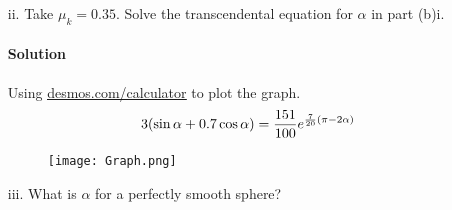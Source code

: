 \documentclass{article}
\begin{document}
{\begin{enumerate}
\begin{enumerate}
				\paragraph{Solution} When the bead leaves the surface of the sphere at $\phi = \alpha$, it is no longer in contact and so the normal force $N = 0$. \unboldmath
				\[
					-mR \dot{\phi}^2 = -mg\sin \alpha
				\]
				\[
					\dot{\phi}^2 = \frac{g}{R} \sin \alpha
				\]
				\begin{equation*}
					\begin{split}
						\frac{g}{R} \sin \alpha &= \frac{2g}{R\left( 4\mu_k^2 + 1 \right)} \left[ \left( 2\mu_k^2 - 1 \right) \left( \sin \alpha - e^{\mu_k \left( \pi - 2\alpha \right)} \right) - 3\mu_k \cos \alpha \right] \\
						\sin \alpha &= \frac{2}{4\mu_k^2 + 1} \left[ \left( 2\mu_k^2 - 1 \right)\sin \alpha - \left( 2\mu_k^2 - 1 \right)e^{\mu_k \left( \pi - 2\alpha \right)} - 3\mu_k \cos \alpha \right] \\
						\left( 4\mu_k^2 + 1 \right) \sin \alpha &= 2\left( 2\mu_k^2 - 1 \right)\sin \alpha - 2\left( 2\mu_k^2 - 1 \right)e^{\mu_k \left( \pi - 2\alpha \right)} - 6\mu_k \cos \alpha \\
						3\sin \alpha &= - 2\left( 2\mu_k^2 - 1 \right)e^{\mu_k \left( \pi - 2\alpha \right)} - 6\mu_k \cos \alpha \\
						3( \sin \alpha + 2\mu_k \cos \alpha ) &= 2( 1 - 2\mu^2_k ) e^{\mu_k (\pi - 2\alpha)} \\
					\end{split}
				\end{equation*} \boldmath
				\item[ii.] Take $\mu_k = 0.35$. Solve the transcendental equation for $\alpha$ in part (b)i.
				\paragraph{Solution} Using \href{https://www.desmos.com/calculator/pkcbf2ms6s}{\underline{desmos.com/calculator}} to plot the graph. \\ \unboldmath
				\[
					3( \sin \alpha + 0.7 \cos \alpha ) = \frac{151}{100} e^{\frac{7}{20} (\pi - 2\alpha)} \\
				\]
				\begin{figure}[!h]
					\centering
					\texttt{[image: Graph.png]}
				\end{figure}
				\boldmath
				\item[iii.] What is $\alpha$ for a perfectly smooth sphere?

\end{enumerate}
\end{enumerate}}
\end{document}
